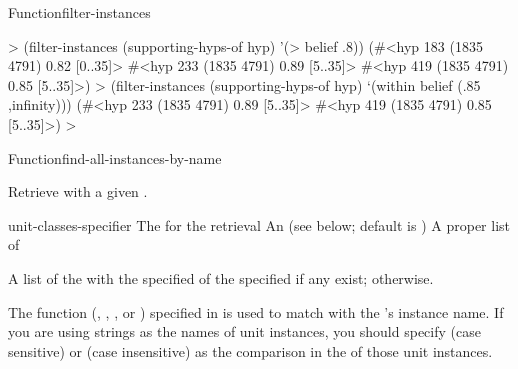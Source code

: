 \documentclass[10pt,twoside,english,pdftex]{article}
\begin{document}
\begin{functiondoc}{Function}{filter-instances}
\fnexamples
%
\W\supp
\begin{example}
  > (filter-instances (supporting-hyps-of hyp) '(> belief .8))
  (#<hyp 183 (1835 4791) 0.82 [0..35]>
   #<hyp 233 (1835 4791) 0.89 [5..35]>
   #<hyp 419 (1835 4791) 0.85 [5..35]>)\goodpagebreak
  > (filter-instances (supporting-hyps-of hyp) `(within belief (.85 ,infinity)))
  (#<hyp 233 (1835 4791) 0.89 [5..35]>
   #<hyp 419 (1835 4791) 0.85 [5..35]>)
  >
\end{example}

\end{functiondoc}


\begin{functiondoc}{Function}{find-all-instances-by-name}%
  {
      
    \returns{} } 
%
%
%

\fnsyntax

\fnpurpose Retrieve  with a given .

\fnpackage {}

\fnmodule {}

\fnargs
\begin{args}{unit-classes-specifier}
 The  for the retrieval
 An 
(see below; default is )
 A proper list of 
\end{args}

\fnreturns A list of the  with the specified
 of the specified  if any exist; \nil{} otherwise.

\fndsyntax
\W\supp\tabletop
\unitclassspec
\subclassingspec

\fndescription The  function
(, , , or )
specified in  is used to match
 with the 's instance name.
If you are using strings as the names of unit instances, you should specify
 (case sensitive) or  (case
insensitive) as the comparison  in the  of
those unit instances.


\end{functiondoc}
\end{document}
